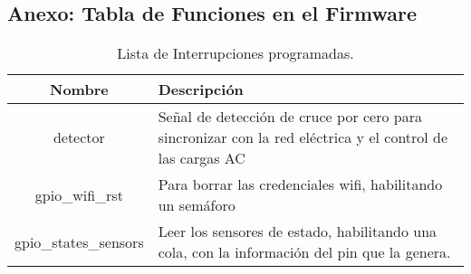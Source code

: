 \begin{appendix}
\chapter{Anexo: Tabla de Funciones en el Firmware}\label{AnexoA}

\begin{table}[H]
	\begin{center}
		\caption{Lista de Interrupciones programadas.}
		\label{table:inte}
		\begin{tabular}{|c|p{5cm}|}
			\hline 
			Nombre & Descripción \\ 
			\hline 
			detector & Señal de detección de cruce por cero para sincronizar con la red eléctrica y el control de las cargas AC \\ 
			\hline 
			gpio\_wifi\_rst & Para borrar las credenciales wifi, habilitando un semáforo\\ 
			\hline 
			gpio\_states\_sensors & Leer los sensores de estado, habilitando una cola, con la información del pin que la genera. \\ 
			\hline 
		\end{tabular} 
	\end{center}
\end{table}
	

\end{appendix}

